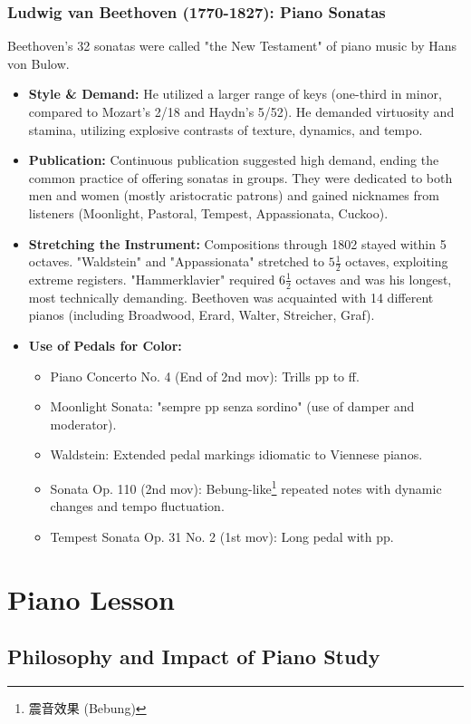 \documentclass[math,code]{amznotes}
\theoremstyle{remark}
\begin{document}
\subsubsection{Ludwig van Beethoven (1770-1827): Piano Sonatas}
Beethoven's 32 sonatas were called "the New Testament" of piano music by Hans von Bulow.
\begin{itemize}
    \item \textbf{Style \& Demand:} He utilized a larger range of keys (one-third in minor, compared to Mozart's 2/18 and Haydn's 5/52). He demanded virtuosity and stamina, utilizing explosive contrasts of texture, dynamics, and tempo. 
    \item \textbf{Publication:} Continuous publication suggested high demand, ending the common practice of offering sonatas in groups. They were dedicated to both men and women (mostly aristocratic patrons) and gained nicknames from listeners (Moonlight, Pastoral, Tempest, Appassionata, Cuckoo).
    \item \textbf{Stretching the Instrument:} Compositions through 1802 stayed within 5 octaves. "Waldstein" and "Appassionata" stretched to $5\frac{1}{2}$ octaves, exploiting extreme registers. "Hammerklavier" required $6\frac{1}{2}$ octaves and was his longest, most technically demanding. Beethoven was acquainted with 14 different pianos (including Broadwood, Erard, Walter, Streicher, Graf).
    \item \textbf{Use of Pedals for Color:}
    \begin{itemize}
        \item Piano Concerto No. 4 (End of 2nd mov): Trills pp to ff.
        \item Moonlight Sonata: "sempre pp senza sordino" (use of damper and moderator).
        \item Waldstein: Extended pedal markings idiomatic to Viennese pianos.
        \item Sonata Op. 110 (2nd mov): Bebung-like\footnote{震音效果 (Bebung)} repeated notes with dynamic changes and tempo fluctuation.
        \item Tempest Sonata Op. 31 No. 2 (1st mov): Long pedal with pp.
    \end{itemize}
\end{itemize}

\section{Piano Lesson}

\subsection{Philosophy and Impact of Piano Study}
\end{document}
